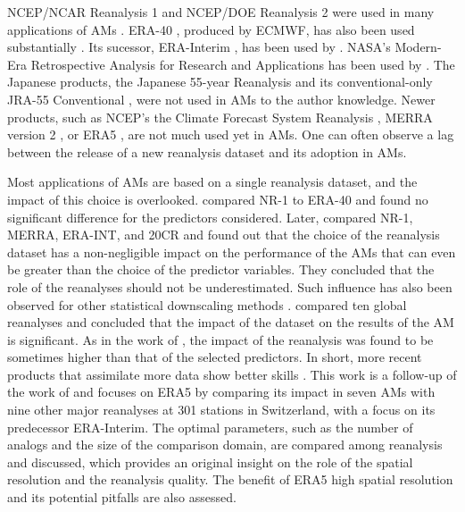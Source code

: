 \documentclass[alpha-refs]{wiley-article}
\begin{document}
NCEP/NCAR Reanalysis 1 \citep[NR-1 --][]{Kalnay1996, Kistler2001} and NCEP/DOE Reanalysis 2 \citep[NR-2 --][]{Kanamitsu2002} were used in many applications of AMs \citep{Timbal2003, Bontron2004, Wetterhall2005a, Gangopadhyay2005, Altava-Ortiz2006, Barrera2007, Cannon2007, Matulla2007, Bliefernicht2007, Maurer2008, BenDaoud2009, Wu2012, Marty2012, Teng2012, Horton2012, Yiou2014}. ERA-40 \citep{Uppala2005}, produced by ECMWF, has also been used substantially \citep {BenDaoud2009, Willems2011b, JakobThemessl2011a, BenDaoud2011, Turco2011a, Franke2011, Pascual2012b, Schenk2012, Ribalaygua2013a, Osca2013, Radanovics2013, Martin2014b, Chardon2014, BenDaoud2016}. Its sucessor, ERA-Interim \citep[ERA-INT --][]{Dee2011a}, has been used by \cite{Raynaud2016b}. NASA's Modern-Era Retrospective Analysis for Research and Applications \citep[MERRA -- ][]{Rienecker2011} has been used by \citet{Vanvyve2015}. The Japanese products, the Japanese 55-year Reanalysis \citep[JRA-55 --][]{Kobayashi2015, Harada2016} and its conventional-only JRA-55 Conventional \citep[JRA-55C --][]{Kobayashi2014}, were not used in AMs to the author knowledge. Newer products, such as NCEP's the Climate Forecast System Reanalysis \citep[CFSR --][]{Saha2010a}, MERRA version 2 \citep[MERRA-2 -- ][]{Gelaro2017}, or ERA5 \citep{Hersbach2019}, are not much used yet in AMs. One can often observe a lag between the release of a new reanalysis dataset and its adoption in AMs.

Most applications of AMs are based on a single reanalysis dataset, and the impact of this choice is overlooked. \citet{BenDaoud2009} compared NR-1 to ERA-40 and found no significant difference for the predictors considered. Later, \citet{Dayon2015} compared NR-1, MERRA, ERA-INT, and 20CR and found out that the choice of the reanalysis dataset has a non-negligible impact on the performance of the AMs that can even be greater than the choice of the predictor variables. They concluded that the role of the reanalyses should not be underestimated. Such influence has also been observed for other statistical downscaling methods \citep[e.g.][]{Koukidis2009}. \citet{Horton2018b} compared ten global reanalyses and concluded that the impact of the dataset on the results of the AM is significant. As in the work of \citet{Dayon2015}, the impact of the reanalysis was found to be sometimes higher than that of the selected predictors. In short, more recent products that assimilate more data show better skills \citep{Horton2018b}. This work is a follow-up of the work of \citet{Horton2018b} and focuses on ERA5 by comparing its impact in seven AMs with nine other major reanalyses at 301 stations in Switzerland, with a focus on its predecessor ERA-Interim. The optimal parameters, such as the number of analogs and the size of the comparison domain, are compared among reanalysis and discussed, which provides an original insight on the role of the spatial resolution and the reanalysis quality. The benefit of ERA5 high spatial resolution and its potential pitfalls are also assessed.
\end{document}
